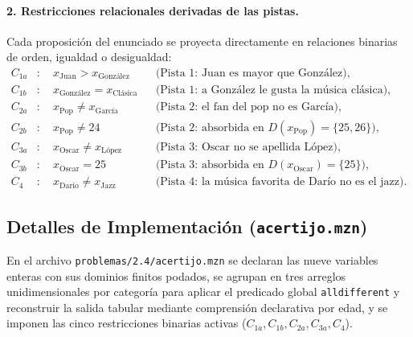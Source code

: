 \paragraph{2. Restricciones relacionales derivadas de las pistas.}
Cada proposición del enunciado se proyecta directamente en relaciones binarias de orden, igualdad o desigualdad:
\begin{align}
    C_{1a} &: \quad x_{\text{Juan}} > x_{\text{González}} && \text{(Pista 1: Juan es mayor que González)}, \label{eq:al_c1a} \\
    C_{1b} &: \quad x_{\text{González}} = x_{\text{Clásica}} && \text{(Pista 1: a González le gusta la música clásica)}, \label{eq:al_c1b} \\
    C_{2a} &: \quad x_{\text{Pop}} \neq x_{\text{García}} && \text{(Pista 2: el fan del pop no es García)}, \label{eq:al_c2a} \\
    C_{2b} &: \quad x_{\text{Pop}} \neq 24 && \text{(Pista 2: absorbida en } D(x_{\text{Pop}}) = \{25, 26\}\text{)}, \label{eq:al_c2b} \\
    C_{3a} &: \quad x_{\text{Oscar}} \neq x_{\text{López}} && \text{(Pista 3: Oscar no se apellida López)}, \label{eq:al_c3a} \\
    C_{3b} &: \quad x_{\text{Oscar}} = 25 && \text{(Pista 3: absorbida en } D(x_{\text{Oscar}}) = \{25\}\text{)}, \label{eq:al_c3b} \\
    C_{4}  &: \quad x_{\text{Darío}} \neq x_{\text{Jazz}} && \text{(Pista 4: la música favorita de Darío no es el jazz)}. \label{eq:al_c4}
\end{align}

\subsection{Detalles de Implementación (\texttt{acertijo.mzn})}

En el archivo \texttt{problemas/2.4/acertijo.mzn} se declaran las nueve variables enteras con sus dominios finitos podados, se agrupan en tres arreglos unidimensionales por categoría para aplicar el predicado global \texttt{alldifferent} y reconstruir la salida tabular mediante comprensión declarativa por edad, y se imponen las cinco restricciones binarias activas ($C_{1a}, C_{1b}, C_{2a}, C_{3a}, C_{4}$).

